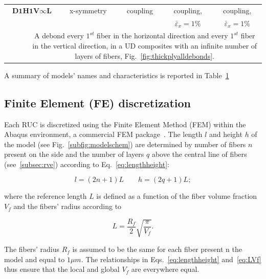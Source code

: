 \documentclass[review]{elsarticle}
\begin{document}
\begin{table}[!h]
\begin{tabularx}{\textwidth}{p{}ccccc}
\midrule
\multicolumn{2}{c}{$\mathbf{D1H1V\infty L}$} &x-symmetry&coupling&coupling,&coupling,\\
                                                         &  &  &  & $\bar{\varepsilon}_{x}=1\%$ & $\bar{\varepsilon}_{x}=1\%$ \\
&\multicolumn{5}{X}{\small A debond every $1^{st}$ fiber in the horizontal direction and every $1^{st}$ fiber in the vertical direction, in a UD composites with an infinite number of  layers of fibers, Fig.~\ref{fig:thickplyalldebonds}.}\\
\bottomrule
\end{tabularx}
\label{tab:modelcharacteristics}
\end{table}

A summary of models' names and characteristics is reported in Table~\ref{tab:modelcharacteristics}

\subsection{Finite Element (FE) discretization}

Each RUC is discretized using the Finite Element Method (FEM) within the Abaqus environment, a commercial FEM package~\cite{abq12}. The length $l$ and height $h$ of the model (see Fig.~\ref{subfig:modelschem}) are determined by number of fibers $n$ present on the side and the number of layers $q$ above the central line of fibers (see~\ref{subsec:rve}) according to Eq.~\ref{eq:lengthheight}:

\begin{equation}\label{eq:lengthheight}
l=\left(2n+1\right)L\qquad h=\left(2q+1\right)L;
\end{equation}

where the reference length $L$ is defined as a function of the fiber volume fraction $V_{f}$ and the fibers' radius according to

\begin{equation}\label{eq:LVf}
L=\frac{R_{f}}{2}\sqrt{\frac{\pi}{V_{f}}}.
\end{equation}

The fibers' radius $R_{f}$ is assumed to be the same for each fiber present n the model and equal to $1\mu m$. The relationships in Eqs.~\ref{eq:lengthheight} and~\ref{eq:LVf} thus ensure that the local and global $V_{f}$ are everywhere equal. 
\end{document}
